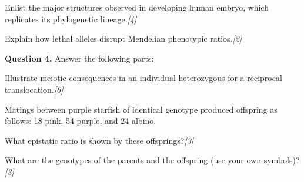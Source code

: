 \documentclass[11pt,a4paper]{article}
\newcommand{\pts}[1]{\hfill   \textit{[#1]}}
\begin{document}
\begin{parts}
\begin{center}
  \end{center}

  \item Enlist the major structures observed in developing human embryo, which replicates its phylogenetic lineage.\pts{4}
  \item Explain how lethal alleles disrupt Mendelian phenotypic ratios.\pts{2}
\end{parts}

\medskip


\noindent   \textbf{Question 4.} Answer the following parts:

\begin{parts}
  \item Illustrate meiotic consequences in an individual heterozygous for a reciprocal translocation.\pts{6}
  \item Matings between purple starfish of identical genotype produced offspring as follows: 18 pink, 54 purple, and 24 albino.
  
\begin{parts}
    \item What epistatic ratio is shown by these offsprings?\pts{3}
    \item What are the genotypes of the parents and the offspring (use your own symbols)?\pts{3}
  \end{parts}
\end{parts}
\end{document}
